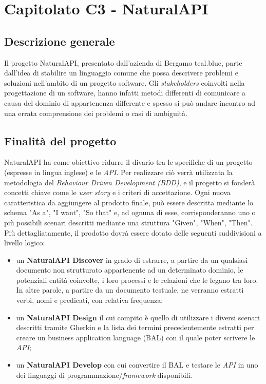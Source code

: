 \section{Capitolato C3 - NaturalAPI }

\subsection{Descrizione generale}
Il progetto NaturalAPI, presentato dall’azienda di Bergamo teal.blue, parte dall'idea di stabilire un linguaggio comune che possa descrivere problemi e soluzioni nell'ambito di un progetto software. Gli \textit{stakeholders\glo} coinvolti nella progettazione di un software, hanno infatti metodi differenti di comunicare a causa del dominio di appartenenza differente e spesso si può andare incontro ad una errata comprensione dei problemi o casi di ambiguità.

\subsection{Finalità del progetto}
NaturalAPI ha come obiettivo ridurre il divario tra le specifiche di un progetto (espresse in lingua inglese) e le \textit{API\glos}. Per realizzare ciò verrà utilizzata la metodologia del \textit{Behaviour Driven Development (BDD)\glos}, e il progetto si fonderà concetti chiave come le \textit{user story\glo} e i criteri di accettazione\glo. Ogni nuova caratteristica da aggiungere al prodotto finale, può essere descritta mediante lo schema "As a", "I want", "So that" e, ad ognuna di esse, corrisponderanno uno o più possibili scenari descritti mediante una struttura "Given", "When", "Then". Più dettagliatamente, il prodotto dovrà essere dotato delle seguenti suddivisioni a livello logico:  
\begin{itemize}
	\item un \textbf{NaturalAPI Discover} in grado di estrarre, a partire da un qualsiasi documento non strutturato appartenente ad un determinato dominio, le potenziali entità coinvolte, i loro processi e le relazioni che le legano tra loro. In altre parole, a partire da un documento testuale, ne verranno estratti verbi, nomi e predicati, con relativa frequenza;
	\item un \textbf{NaturalAPI Design} il cui compito è quello di utilizzare i diversi scenari descritti tramite Gherkin e la lista dei termini precedentemente estratti per creare un business application language (BAL) con il quale poter scrivere le \textit{API\glos};
	\item un \textbf{NaturalAPI Develop} con cui convertire il BAL e testare le \textit{API\glo} in uno dei  linguaggi di programmazione/\textit{framework\glo} disponibili. 
\end{itemize}

